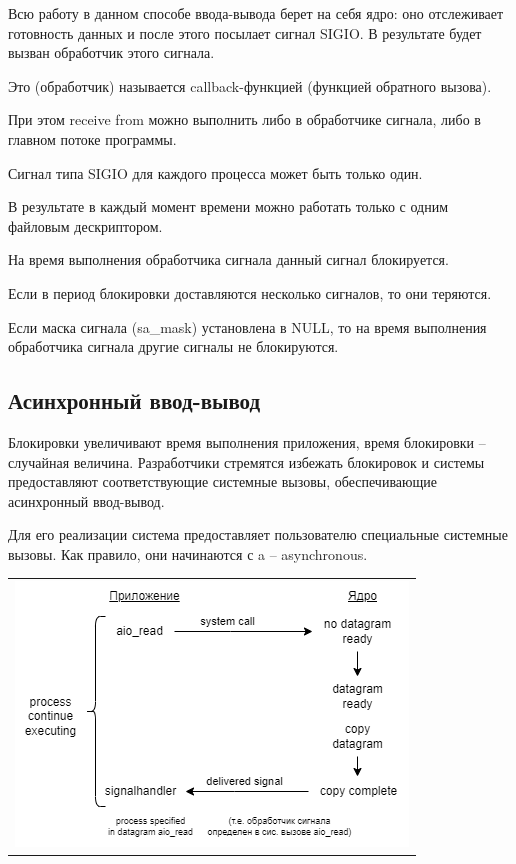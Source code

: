 Всю работу в данном способе ввода-вывода берет на себя ядро: оно отслеживает готовность данных и после этого посылает сигнал SIGIO. В результате будет вызван обработчик этого сигнала.

Это (обработчик) называется callback-функцией (функцией обратного вызова).

При этом receive from можно выполнить либо в обработчике сигнала, либо в главном потоке программы.

Сигнал типа SIGIO для каждого процесса может быть только один.

В результате в каждый момент времени можно работать только с одним файловым дескриптором.

На время выполнения обработчика сигнала данный сигнал блокируется.

Если в период блокировки доставляются несколько сигналов, то они теряются.

Если маска сигнала (sa\_mask) установлена в NULL, то на время выполнения обработчика сигнала другие сигналы не блокируются.

\subsection{Асинхронный ввод-вывод}

Блокировки увеличивают время выполнения приложения, время блокировки – случайная величина. Разработчики стремятся избежать блокировок и системы предоставляют соответствующие системные вызовы, обеспечивающие асинхронный ввод-вывод. 

Для его реализации система предоставляет пользователю специальные системные вызовы. Как правило, они начинаются с a – asynchronous.

\begin{table}[H]
  \centering
  \begin{tabular}{p{1\linewidth}}
    \centering
    \includegraphics[width=0.8\linewidth]{./images/1-5.png}
  \end{tabular}
\end{table}

